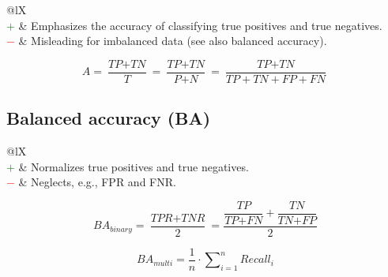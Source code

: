\documentclass{article}
\begin{document}
\begin{table}[H]\centering
	\begin{tabularx}{\textwidth}{@{}lX}
		 \\
		\textcolor{Green}{$+$} & Emphasizes the accuracy of classifying true positives and true negatives. \\
		\textcolor{Red}{$-$}   & Misleading for imbalanced data (see also balanced accuracy).
	\end{tabularx}
\end{table}

\begin{equation}
	A = \dfrac{\textit{TP} + \textit{TN}}{\textit{T}} = \dfrac{\textit{TP} + \textit{TN}}{\textit{P} + \textit{N}} = \dfrac{\textit{TP} + \textit{TN}}{\textit{TP} + \textit{TN} + \textit{FP} + \textit{FN}}
%
	\label{equation:A}
\end{equation}


\subsection[Balanced accuracy (BA)]{Balanced accuracy (BA) \cite{brodersen2010balanced, kelleher2020fundamentals}}

\begin{table}[H]\centering
	\begin{tabularx}{\textwidth}{@{}lX}
		 \\
		\textcolor{Green}{$+$} & Normalizes true positives and true negatives. \\
		\textcolor{Red}{$-$}   & Neglects, e.g., FPR and FNR.
	\end{tabularx}
\end{table}

\begin{equation}
	\textit{BA}_\textit{binary} = \dfrac{\textit{TPR} + \textit{TNR}}{2} = \dfrac{\dfrac{\textit{TP}}{\textit{TP} + \textit{FN}} + \dfrac{\textit{TN}}{\textit{TN} + \textit{FP}}}{2}
%
	\label{equation:BA_binary}
\end{equation}

\begin{equation}
	\textit{BA}_\textit{multi} = \dfrac{1}{n} \cdot \sum\nolimits_{i = 1}^n \textit{Recall}_i
%
	\label{equation:BA_multi}
\end{equation}
\end{document}
